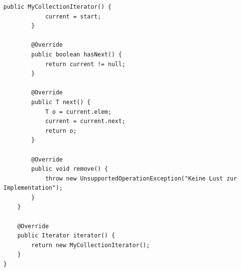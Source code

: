 \documentclass{article}
\begin{document}
\begin{enumerate}[label=(\alph*)]
\begin{lstlisting}[style=java,tabsize=2]
		public MyCollectionIterator() {
			current = start;
		}

		@Override
		public boolean hasNext() {
			return current != null;
		}

		@Override
		public T next() {
			T o = current.elem;
			current = current.next;
			return o;
		}

		@Override
		public void remove() {
			throw new UnsupportedOperationException("Keine Lust zur Implementation");
		}
	}

	@Override
	public Iterator iterator() {
		return new MyCollectionIterator();
	}
}
		\end{lstlisting}
	\end{enumerate}
	
\end{document}
